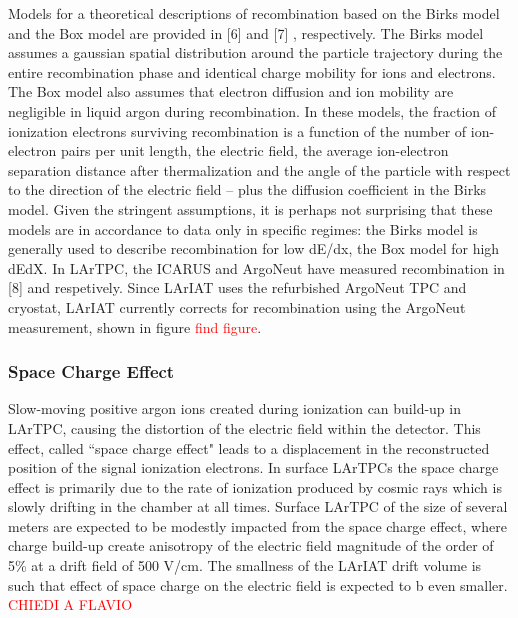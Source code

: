 Models for a theoretical descriptions of recombination based on the Birks model and the Box model are provided in [6] and  [7] , respectively. The Birks model assumes a gaussian spatial distribution around the particle trajectory during the entire recombination phase and identical charge mobility for ions and electrons. The Box model also assumes that electron diffusion and ion mobility are negligible in liquid argon during recombination.
In these models, the fraction of ionization electrons surviving recombination is a function of the number of ion-electron pairs per unit length, the electric field, the average ion-electron separation distance after thermalization and the angle of the particle with respect to the direction of the electric field -- plus the diffusion coefficient in the Birks model. Given the stringent assumptions, it is perhaps  not surprising that these models are in accordance to data only in specific regimes: the Birks model is generally used to describe recombination for low dE/dx, the Box model for high dEdX.
In LArTPC, the ICARUS and ArgoNeut have measured recombination in [8] and \cite{1748-0221-8-08-P08005} respetively. Since LArIAT uses the refurbished ArgoNeut TPC and cryostat,  LArIAT currently corrects for recombination using the ArgoNeut measurement, shown in figure \textcolor{red}{find figure}.


\subsubsection{Space Charge Effect}
Slow-moving positive argon ions created during ionization can build-up in LArTPC, causing the distortion of the
electric field within the detector. This effect, called  ``space charge effect" leads to a displacement in the reconstructed position of the signal ionization electrons. In surface LArTPCs the space charge effect is primarily due to the rate of ionization produced by cosmic rays which is slowly drifting in the chamber at all times. Surface LArTPC of the size of several meters are expected to be modestly impacted from the space charge effect, where charge build-up create anisotropy of the electric field magnitude of the order of  5\% at a drift field of 500 V/cm. The smallness of the LArIAT drift volume is such that  effect of  space charge on the electric field is expected to b even smaller. \textcolor{red}{CHIEDI A FLAVIO}

